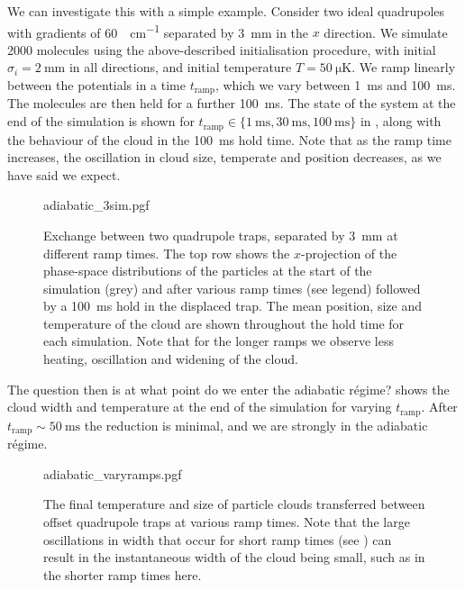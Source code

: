 We can investigate this with a simple example.  Consider two ideal quadrupoles
with gradients of \SI{60}{\gauss\per\centi\meter} separated by
\SI{3}{\milli\meter} in the $x$ direction. We simulate 2000 \CaF{} molecules
using the above-described initialisation procedure, with initial $\sigma_i =
\SI{2}{\milli\meter}$ in all directions, and initial temperature
$T=\SI{50}{\micro\kelvin}$. We ramp linearly between the potentials in a time
$t_\text{ramp}$, which we vary between \SI{1}{\milli\second} and
\SI{100}{\milli\second}. The molecules are then held for a further
\SI{100}{\milli\second}. The state of the system at the end of the simulation
is shown for $t_\text{ramp}\in \{\SI{1}{\milli\second}, \SI{30}{\milli\second},
\SI{100}{\milli\second}\}$ in , along with the
behaviour of the cloud in the \SI{100}{\milli\second} hold time. Note that as
the ramp time increases, the oscillation in cloud size, temperate and position
decreases, as we have said we expect.

\begin{figure}[p]
\centering
  {adiabatic_3sim.pgf}
  \caption{
    Exchange between two quadrupole traps, separated by \SI{3}{\milli\meter} at
    different ramp times. The top row shows the $x$-projection of the
    phase-space distributions of the particles at the start of the simulation
    (grey) and after various ramp times (see legend) followed by a
    \SI{100}{\milli\second} hold in the displaced trap. The mean position, size and
    temperature of the cloud are shown throughout the hold time for each
    simulation. Note that for the longer ramps we observe less heating,
    oscillation and widening of the cloud.
  }
  \label{design:fig:adia3sim}
\end{figure}


The question then is at what point do we enter the adiabatic r\'egime?
 shows the cloud width and temperature at the end
of the simulation for varying $t_\text{ramp}$. After
$t_\text{ramp}\sim\SI{50}{\milli\second}$ the reduction is minimal, and we are
strongly in the adiabatic r\'egime.

\begin{figure}[tbhp]
\centering
  {adiabatic_varyramps.pgf}
  \caption{
    The final temperature and size of particle clouds transferred between
    offset quadrupole traps at various ramp times. Note that the large
    oscillations in width that occur for short ramp times (see
    ) can result in the instantaneous width of
    the cloud being small, such as in the shorter ramp times here.
  }
  \label{design:fig:adiavary}
\end{figure}

